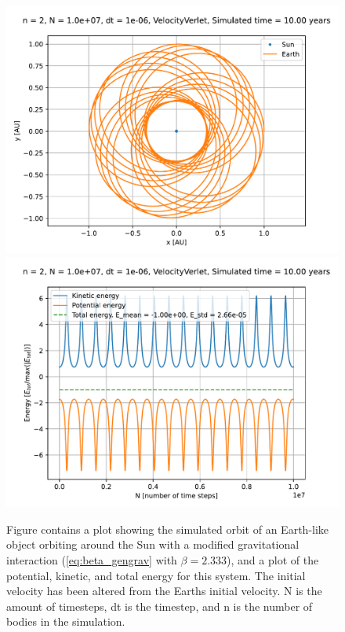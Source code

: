 \documentclass[reprint,english,notitlepage]{revtex4-1}  %
\begin{document}
\begin{figure}[H]
\includegraphics[scale=0.5]{../data/figures/varyingbeta/se_peturbed_beta233_vv_orbits2D.pdf}
\includegraphics[scale=0.5]{../data/figures/varyingbeta/se_peturbed_beta233_vv_energy.pdf}
\caption{Figure contains a plot showing the simulated orbit of an Earth-like object orbiting around the Sun with a modified gravitational interaction (\eqref{eq:beta_gengrav} with $\beta = 2.333$), and a plot of the potential, kinetic, and total energy for this system. The initial velocity has been altered from the Earths initial velocity. N is the amount of timesteps, dt is the timestep, and n is the number of bodies in the simulation.}
\label{fig:beta233_peturbed}
\end{figure}
\end{document}

